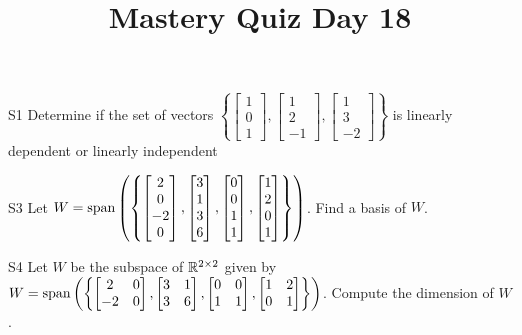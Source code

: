 \documentclass{sbgLAquiz}
\title{Mastery Quiz Day 18 }
\begin{document}
\begin{problem}{S1}
Determine if the set of vectors  $\left\{\begin{bmatrix} 1 \\ 0 \\ 1 \end{bmatrix}, \begin{bmatrix} 1 \\ 2 \\ -1 \end{bmatrix}, \begin{bmatrix} 1 \\ 3 \\ -2 \end{bmatrix}\right\}$ is  linearly dependent or linearly independent
\end{problem}

\begin{problem}{S3}
Let $W={\rm span}\left(\left\{\begin{bmatrix} 2 \\ 0 \\ -2 \\ 0 \end{bmatrix}, \begin{bmatrix} 3 \\ 1 \\ 3 \\ 6 \end{bmatrix}, \begin{bmatrix} 0 \\ 0 \\ 1 \\ 1 \end{bmatrix}, \begin{bmatrix}1 \\ 2 \\ 0 \\ 1 \end{bmatrix}\right\}\right)$.  Find a basis of $W$.
\end{problem}
\newpage

\begin{problem}{S4}
Let $W$ be the subspace of $\mathbb{R}^{2\times2}$ given by $W={\rm span}\left(\left\{\begin{bmatrix} 2 & 0 \\ -2 & 0 \end{bmatrix}, \begin{bmatrix} 3 & 1 \\ 3 & 6 \end{bmatrix}, \begin{bmatrix} 0 & 0 \\ 1 & 1 \end{bmatrix}, \begin{bmatrix}1 & 2 \\ 0 & 1 \end{bmatrix}\right\}\right)$. Compute the dimension of $W$.
\end{problem}
\end{document}
